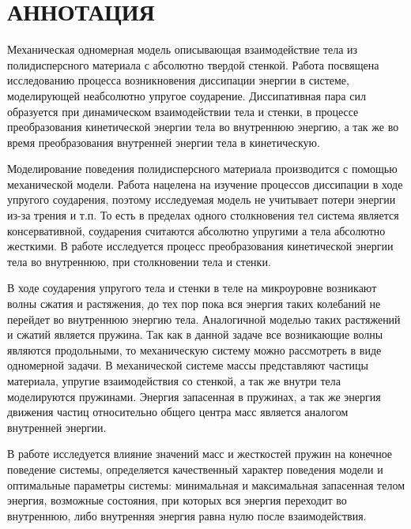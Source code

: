 \chapter*{АННОТАЦИЯ}

Механическая одномерная модель описывающая взаимодействие тела из полидисперсного материала с абсолютно твердой стенкой.
Работа посвящена исследованию процесса возникновения диссипации энергии в системе, моделирующей неабсолютно упругое соударение.
Диссипативная пара сил образуется при динамическом взаимодействии тела и стенки, в процессе преобразования кинетической энергии тела во внутреннюю энергию, а так же во время преобразования внутренней энергии тела в кинетическую.

Моделирование поведения полидисперсного материала производится с помощью
механической модели. Работа нацелена на изучение процессов диссипации в ходе упругого соударения, поэтому
исследуемая модель не учитывает потери энергии из-за трения и т.п. То есть в пределах
одного столкновения тел система является консервативной, соударения считаются
абсолютно упругими а тела абсолютно жесткими. В работе исследуется процесс
преобразования кинетической энергии тела во внутреннюю, при столкновении тела и стенки.

В ходе соударения упругого тела и стенки в теле на микроуровне возникают волны сжатия и растяжения, до тех пор пока вся энергия таких колебаний не перейдет во внутреннюю энергию тела. Аналогичной моделью таких растяжений и сжатий является пружина. Так как в данной задаче все возникающие волны являются продольными, то механическую систему можно рассмотреть в виде одномерной задачи. В механической системе массы представляют частицы материала, упругие взаимодействия со стенкой, а так же внутри тела моделируются пружинами. Энергия запасенная в пружинах, а так же энергия движения частиц относительно общего центра масс является аналогом внутренней энергии.

В работе исследуется влияние значений масс и жесткостей пружин на конечное поведение системы,
определяется качественный характер поведения модели и оптимальные параметры системы:
минимальная и максимальная запасенная телом энергия, возможные состояния, при которых вся энергия переходит во внутреннюю, либо внутренняя энергия равна нулю после взаимодействия.


